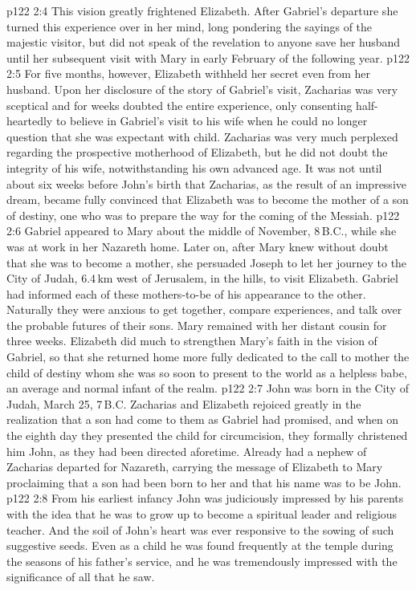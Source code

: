 \vs p122 2:4 This vision greatly frightened Elizabeth. After Gabriel’s departure she turned this experience over in her mind, long pondering the sayings of the majestic visitor, but did not speak of the revelation to anyone save her husband until her subsequent visit with Mary in early February of the following year.
\vs p122 2:5 \pc For five months, however, Elizabeth withheld her secret even from her husband. Upon her disclosure of the story of Gabriel’s visit, Zacharias was very sceptical and for weeks doubted the entire experience, only consenting half\hyp{}heartedly to believe in Gabriel’s visit to his wife when he could no longer question that she was expectant with child. Zacharias was very much perplexed regarding the prospective motherhood of Elizabeth, but he did not doubt the integrity of his wife, notwithstanding his own advanced age. It was not until about six weeks before John’s birth that Zacharias, as the result of an impressive dream, became fully convinced that Elizabeth was to become the mother of a son of destiny, one who was to prepare the way for the coming of the Messiah.
\vs p122 2:6 Gabriel appeared to Mary about the middle of November, 8\,B.C., while she was at work in her Nazareth home. Later on, after Mary knew without doubt that she was to become a mother, she persuaded Joseph to let her journey to the City of Judah, 6.4\,km west of Jerusalem, in the hills, to visit Elizabeth. Gabriel had informed each of these mothers\hyp{}to\hyp{}be of his appearance to the other. Naturally they were anxious to get together, compare experiences, and talk over the probable futures of their sons. Mary remained with her distant cousin for three weeks. Elizabeth did much to strengthen Mary’s faith in the vision of Gabriel, so that she returned home more fully dedicated to the call to mother the child of destiny whom she was so soon to present to the world as a helpless babe, an average and normal infant of the realm.
\vs p122 2:7 \pc John was born in the City of Judah, March 25, 7\,B.C. Zacharias and Elizabeth rejoiced greatly in the realization that a son had come to them as Gabriel had promised, and when on the eighth day they presented the child for circumcision, they formally christened him John, as they had been directed aforetime. Already had a nephew of Zacharias departed for Nazareth, carrying the message of Elizabeth to Mary proclaiming that a son had been born to her and that his name was to be John.
\vs p122 2:8 From his earliest infancy John was judiciously impressed by his parents with the idea that he was to grow up to become a spiritual leader and religious teacher. And the soil of John’s heart was ever responsive to the sowing of such suggestive seeds. Even as a child he was found frequently at the temple during the seasons of his father’s service, and he was tremendously impressed with the significance of all that he saw.
